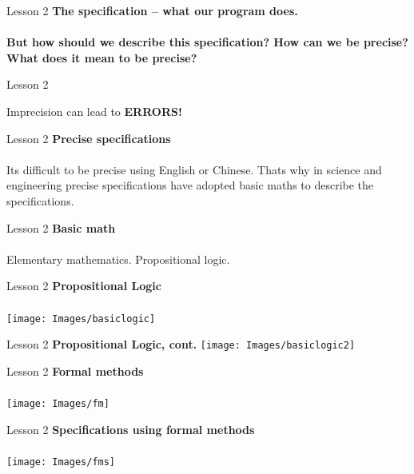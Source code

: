 \documentclass[aspectratio=1610]{beamer}
\begin{document}
\begin{frame}{Lesson 2}{}
\LARGE
    \textbf{The specification -- what our program does.}\\~\\
  
\textbf{But how should we describe this specification? How can we be precise? What does it mean to be precise?}
\end{frame}



\begin{frame}{Lesson 2}{}
\begin{center}
\Huge
	Imprecision can lead to \alert{\textbf{ERRORS!}}
\end{center}
\end{frame}


\begin{frame}{Lesson 2}{}
\LARGE
\textbf{Precise specifications}\\~\\
Its difficult to be precise using English or Chinese. Thats why in science and engineering precise specifications have adopted basic maths to describe the specifications.
\end{frame}


\begin{frame}{Lesson 2}{}
\LARGE
\textbf{Basic math}\\~\\
Elementary mathematics. Propositional logic.
\end{frame}


\begin{frame}{Lesson 2}{}
\LARGE
\textbf{Propositional Logic}\\~\\
\texttt{[image: Images/basiclogic]}
\end{frame}


\begin{frame}{Lesson 2}{}
\LARGE
\textbf{Propositional Logic, cont.}
\texttt{[image: Images/basiclogic2]}
\end{frame}



\begin{frame}{Lesson 2}{}
\LARGE
\textbf{Formal methods}\\~\\
\texttt{[image: Images/fm]}
\end{frame}


\begin{frame}{Lesson 2}{}
\LARGE
\textbf{Specifications using formal methods}\\~\\
\texttt{[image: Images/fms]}
\end{frame}
\end{document}
